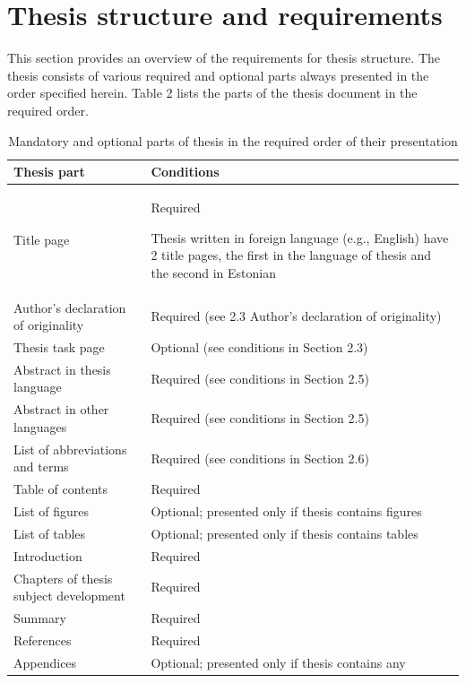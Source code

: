 \section{Thesis structure and requirements}

This section provides an overview of the requirements for thesis
structure. The thesis consists of various required and optional parts
always presented in the order specified herein. Table 2 lists the
parts of the thesis document in the required order.

\begin{table}[!h]
  \caption{Mandatory and optional parts of thesis in the required
    order of their presentation}
  \centering
  \begin{tabular}{|L{5.1cm}|L{9.1cm}|}
    \hline
    \textbf{Thesis part} &  \textbf{Conditions}\\  \hline

    Title page & Required

                 Thesis written in foreign language (e.g., English) have
                 2 title pages, the first in the language of thesis and the
                 second in Estonian\\ \hline

    Author’s declaration of originality & Required (see 2.3 Author’s declaration of originality) \\ \hline
    Thesis task page & Optional (see conditions in Section 2.3) \\ \hline
    Abstract in thesis language & Required (see conditions in Section 2.5) \\\hline
    Abstract in other languages & Required (see conditions in Section 2.5) \\\hline
    List of abbreviations and terms & Required (see conditions in Section 2.6) \\\hline
    Table of contents  & Required \\\hline
    List of figures &  Optional; presented only if thesis contains figures \\\hline
    List of tables  & Optional; presented only if thesis contains tables \\\hline
    Introduction  &Required \\\hline
    Chapters of thesis subject  development  &Required \\\hline
    Summary  &Required \\\hline
    References  &Required \\\hline
    Appendices  &Optional; presented only if thesis contains any\\\hline
  \end{tabular}
\end{table}


